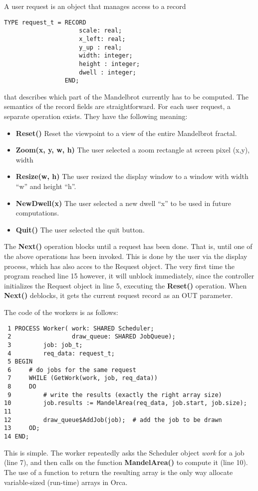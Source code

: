 
A user request is an object that manages access to a record 
\begin{verbatim}
TYPE request_t = RECORD
                     scale: real;
                     x_left: real;
                     y_up : real;
                     width: integer;
                     height : integer;
                     dwell : integer;
                 END;
\end{verbatim}
that describes which part of the Mandelbrot currently has to be computed.
The semantics of the record fields are straightforward.
\Skip\noindent
For each user request, a separate operation exists. They have the following meaning:
\begin{itemize}
\item {\bf Reset()}
Reset the viewpoint to a view of the entire Mandelbrot fractal.
\item {\bf Zoom(x, y, w, h)}
The user selected a zoom rectangle at screen pixel (x,y), width
\item {\bf Resize(w, h)}
The user resized the display window to a window with width 
``w'' and height ``h''. 
\item {\bf NewDwell(x)}
The user selected a new dwell ``x'' to be used in future computations.
\item {\bf Quit()}
The user selected the quit button.
\end{itemize}
The {\bf Next()} operation blocks until a request has been done. 
That is, until one of the above operations has been invoked. This is
done by the user via the display process, which has also acces to the Request 
object. The very first time the program reached line 15 however, it 
will unblock immediately, since the controller initializes the
Request object in line 5, executing the {\bf Reset()} operation. 
When {\bf Next()} deblocks, it gets the current request record as an 
OUT parameter. 

\newpage
{}

The code of the workers is as follows:
\begin{verbatim}
 1 PROCESS Worker( work: SHARED Scheduler;
 2                 draw_queue: SHARED JobQueue);
 3         job: job_t;
 4         req_data: request_t;
 5 BEGIN
 6     # do jobs for the same request
 7     WHILE (GetWork(work, job, req_data))
 8     DO
 9         # write the results (exactly the right array size) 
10         job.results := MandelArea(req_data, job.start, job.size);
11
12         draw_queue$AddJob(job);  # add the job to be drawn 
13     OD;
14 END;
\end{verbatim}
This is simple. The worker repeatedly asks the Scheduler object {\em work} for
a job (line 7), and then calls on the function {\bf MandelArea()} to compute it
(line 10).  The use of a function to return the resulting array is the 
only way allocate variable-sized (run-time) arrays in Orca. 

